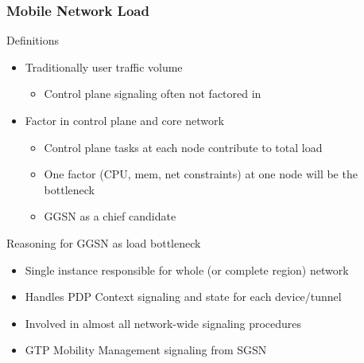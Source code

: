 \documentclass{beamer}
\begin{document}
\begin{frame}
	\frametitle{Mobile Network Load}
	
	Definitions
	\begin{itemize}
		\item Traditionally user traffic volume
			\begin{itemize}
				\item Control plane signaling often not factored in
			\end{itemize}

		\item Factor in control plane and core network
			\begin{itemize}
				\item Control plane tasks at each node contribute to total load
				\item One factor (CPU, mem, net constraints) at one node will be the bottleneck
				\item GGSN as a chief candidate
			\end{itemize}
	\end{itemize}

	\pause
	\vspace{1em}
	\begin{block}{Reasoning for GGSN as load bottleneck}
	\begin{itemize}
		\item Single instance responsible for whole (or complete region) network
		\item Handles PDP Context signaling and state for each device/tunnel
		\item Involved in almost all network-wide signaling procedures
		\item GTP Mobility Management signaling from SGSN
	\end{itemize}
	\end{block}


\end{frame}
\end{document}
